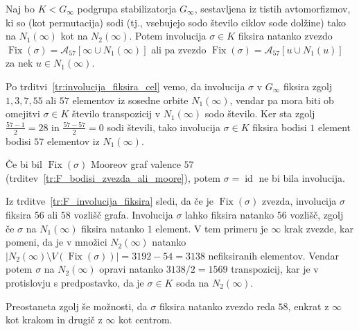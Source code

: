 \documentclass[fin1, tisk]{fmfdelo}
\newcommand{\asch}{\mathscr{A}_{57}}
\newcommand{\fix}{\operatorname{Fix}}
\newcommand{\id}{\operatorname{id}}
\begin{document}
\begin{trditev}\label{tr:involucija_58}
    Naj bo $K < G_{\infty}$ podgrupa stabilizatorja $G_{\infty}$, sestavljena iz tistih avtomorfizmov, ki 
    so (kot permutacija) sodi (tj., vsebujejo sodo število ciklov sode dolžine) tako na $N_1(\infty)$ kot na $N_2(\infty)$.
    Potem involucija $\sigma \in K$
    fiksira natanko zvezdo $\fix(\sigma) = \asch[\infty\cup N_1(\infty)]$ ali pa zvezdo
    $\fix(\sigma) = \asch[u\cup N_1(u)]$ za nek $u\in N_1(\infty)$.
\end{trditev}
\begin{dokaz}
    Po trditvi~\ref{tr:involucija_fiksira_cel} vemo, da involucija $\sigma$ v $G_{\infty}$ fiksira 
    zgolj $1, 3, 7, 55$ ali $57$ elementov iz sosedne orbite $N_1(\infty)$, vendar pa mora biti ob
    omejitvi $\sigma \in K$ število transpozicij v $N_1(\infty)$ sodo število. Ker sta 
    zgolj $\frac{57-1}{2} = 28$ in $\frac{57-57}{2}=0$ sodi števili, tako involucija $\sigma\in K$
    fiksira bodisi $1$ element bodisi $57$ elementov iz $N_1(\infty)$.

    Če bi bil $\fix(\sigma)$ Mooreov graf valence $57$ (trditev~\ref{tr:F_bodisi_zvezda_ali_moore}), potem $\sigma=\id$ 
    ne bi bila involucija.

    Iz trditve~\ref{tr:F_involucija_fiksira} sledi, da če je $\fix(\sigma)$ zvezda, 
    involucija $\sigma$ fiksira $56$ ali $58$ vozlišč grafa.
    Involucija $\sigma$ lahko fiksira natanko $56$ vozlišč, zgolj če $\sigma$ na $N_1(\infty)$ fiksira natanko $1$ element. V tem primeru
    je $\infty$ krak zvezde, kar pomeni, da je v množici $N_2(\infty)$ natanko 
    $|N_2(\infty)\setminus V(\fix(\sigma))| = 3192 - 54 = 3138$ nefiksiranih elementov. Vendar potem $\sigma$
    na $N_2(\infty)$ opravi natanko $3138/2 = 1569$ transpozicij, kar je v protislovju s predpostavko, da 
    je $\sigma\in K$ soda na $N_2(\infty)$. 

    Preostaneta zgolj še možnosti, da $\sigma$
    fiksira natanko zvezdo reda $58$, enkrat z $\infty$ kot krakom in drugič
    z $\infty$ kot centrom.
\end{dokaz}
\end{document}
